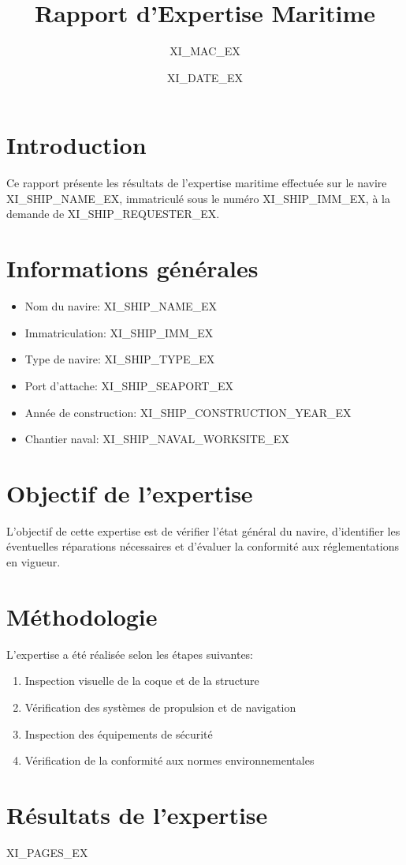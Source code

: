 \documentclass[12pt,a4paper]{article}
\title{Rapport d'Expertise Maritime}
\author{XI_MAC_EX}
\date{{\Large XI_DATE_EX}}
\begin{document}
\maketitle
\tableofcontents
\newpage

\section{Introduction}
Ce rapport présente les résultats de l'expertise maritime effectuée sur le navire XI_SHIP_NAME_EX, immatriculé sous le numéro XI_SHIP_IMM_EX, à la demande de XI_SHIP_REQUESTER_EX.

\section{Informations générales}
\begin{itemize}
    \item Nom du navire: XI_SHIP_NAME_EX
    \item Immatriculation: XI_SHIP_IMM_EX
    \item Type de navire: XI_SHIP_TYPE_EX
    \item Port d'attache: XI_SHIP_SEAPORT_EX
    \item Année de construction: XI_SHIP_CONSTRUCTION_YEAR_EX
    \item Chantier naval: XI_SHIP_NAVAL_WORKSITE_EX
\end{itemize}

\section{Objectif de l'expertise}
L'objectif de cette expertise est de vérifier l'état général du navire, d'identifier les éventuelles réparations nécessaires et d'évaluer la conformité aux réglementations en vigueur.

\section{Méthodologie}
L'expertise a été réalisée selon les étapes suivantes:
\begin{enumerate}
    \item Inspection visuelle de la coque et de la structure
    \item Vérification des systèmes de propulsion et de navigation
    \item Inspection des équipements de sécurité
    \item Vérification de la conformité aux normes environnementales
\end{enumerate}

\newpage
\section{Résultats de l'expertise}
XI_PAGES_EX
\end{document}
